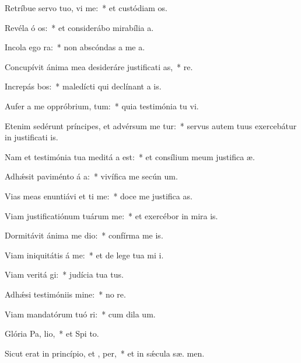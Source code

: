 \item Retríbue servo tuo, vi me:~* et custódiam  os.
\item Revéla ó os:~* et considerábo mirabília   a.
\item Incola ego   ra:~* non abscóndas a me  a.
\item Concupívit ánima mea desideráre justificati as,~*   re.
\item Increpás bos:~* maledícti qui declínant a  is.
\item Aufer a me oppróbrium,  tum:~* quia testimónia tu vi.
\item Etenim sedérunt príncipes, et advérsum me tur:~* servus autem tuus exercebátur in justificati is.
\item Nam et testimónia tua meditá a est:~* et consílium meum justifica æ.
\item Adhǽsit paviménto á a:~* vivífica me secún  um.
\item Vias meas enuntiávi et ti me:~* doce me justifica as.
\item Viam justificatiónum tuárum  me:~* et exercébor in mira is.
\item Dormitávit ánima me  dio:~* confírma me   is.
\item Viam iniquitátis á  me:~* et de lege tua mi i.
\item Viam veritá gi:~* judícia tua   tus.
\item Adhǽsi testimóniis  mine:~* no  re.
\item Viam mandatórum tuó ri:~* cum dila  um.
\item Glória Pa,  lio,~* et Spi to.
\item Sicut erat in princípio, et ,  per,~* et in sǽcula sæ. men.
